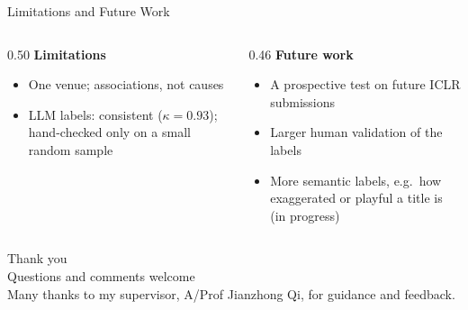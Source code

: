 \documentclass[aspectratio=169,11pt]{beamer}
\begin{document}
\begin{frame}{Limitations and Future Work}
  \begin{columns}[T]
    \begin{column}{0.50\textwidth}
      \textbf{Limitations}
      \begin{itemize}\setlength{\itemsep}{0.4em}
        \item One venue; associations, not causes
        \item LLM labels: consistent ($\kappa = 0.93$); hand-checked only on a small random sample
      \end{itemize}
    \end{column}
    \begin{column}{0.46\textwidth}
      \textbf{Future work}
      \begin{itemize}\setlength{\itemsep}{0.4em}
        \item A prospective test on future ICLR submissions
        \item Larger human validation of the labels
        \item More semantic labels, e.g.\ how exaggerated or playful a title is (in progress)
      \end{itemize}
    \end{column}
  \end{columns}
\end{frame}

\begin{frame}
  \centering
  \vspace{2em}
  {\Large Thank you}\\[1em]
  Questions and comments welcome\\[2em]
  {\small Many thanks to my supervisor, A/Prof Jianzhong Qi, for guidance and feedback.}
\end{frame}
\end{document}
